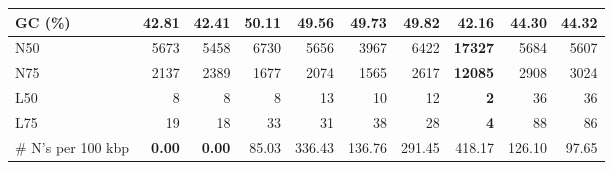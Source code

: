 \documentclass[12pt,a4paper]{article}
\begin{document}
\begin{table}[ht]
\begin{center}
\begin{tabular}{|l*{9}{|r}|}
GC (\%) & 42.81 & 42.41 & 50.11 & 49.56 & 49.73 & 49.82 & 42.16 & 44.30 & 44.32 \\ \hline
N50 & 5673 & 5458 & 6730 & 5656 & 3967 & 6422 & {\bf 17327} & 5684 & 5607 \\ \hline
N75 & 2137 & 2389 & 1677 & 2074 & 1565 & 2617 & {\bf 12085} & 2908 & 3024 \\ \hline
L50 & 8 & 8 & 8 & 13 & 10 & 12 & {\bf 2} & 36 & 36 \\ \hline
L75 & 19 & 18 & 33 & 31 & 38 & 28 & {\bf 4} & 88 & 86 \\ \hline
\# N's per 100 kbp & {\bf 0.00} & {\bf 0.00} & 85.03 & 336.43 & 136.76 & 291.45 & 418.17 & 126.10 & 97.65 \\ \hline
\end{tabular}
\end{center}
\end{table}
\end{document}
